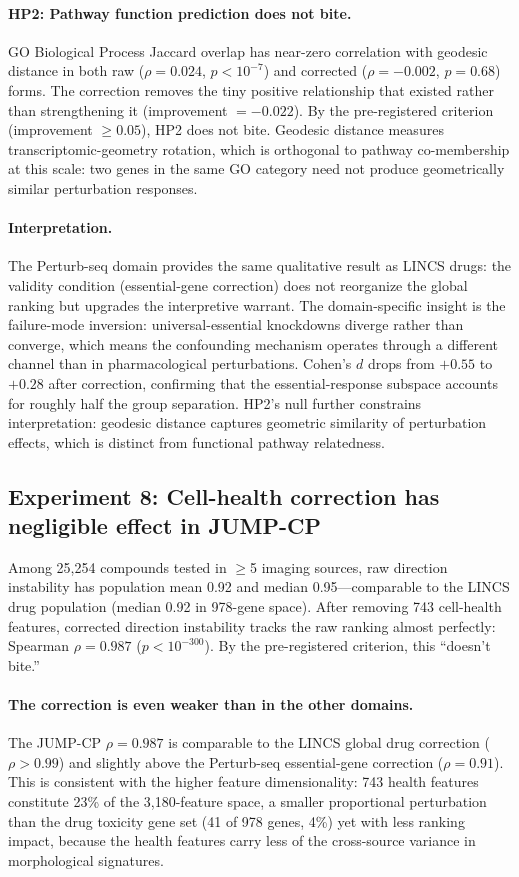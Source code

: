 \documentclass{article}
\begin{document}
\paragraph{HP2: Pathway function prediction does not bite.}
GO Biological Process Jaccard overlap has near-zero correlation with geodesic
distance in both raw ($\rho = 0.024$, $p < 10^{-7}$) and corrected ($\rho =
-0.002$, $p = 0.68$) forms. The correction removes the tiny positive
relationship that existed rather than strengthening it (improvement $=
-0.022$). By the pre-registered criterion (improvement $\geq 0.05$), HP2
does not bite. Geodesic distance measures transcriptomic-geometry rotation,
which is orthogonal to pathway co-membership at this scale: two genes in the
same GO category need not produce geometrically similar perturbation
responses.

\paragraph{Interpretation.}
The Perturb-seq domain provides the same qualitative result as LINCS drugs:
the validity condition (essential-gene correction) does not reorganize the
global ranking but upgrades the interpretive warrant. The domain-specific
insight is the failure-mode inversion: universal-essential knockdowns
diverge rather than converge, which means the confounding mechanism operates
through a different channel than in pharmacological perturbations. Cohen's $d$
drops from $+0.55$ to $+0.28$ after correction, confirming that the
essential-response subspace accounts for roughly half the group separation.
HP2's null further constrains interpretation: geodesic distance captures
geometric similarity of perturbation effects, which is distinct from
functional pathway relatedness.

\subsection{Experiment 8: Cell-health correction has negligible effect in JUMP-CP}

Among 25{,}254 compounds tested in $\geq$5 imaging sources, raw direction
instability has population mean 0.92 and median 0.95---comparable to the
LINCS drug population (median 0.92 in 978-gene space). After removing 743
cell-health features, corrected direction instability tracks the raw ranking
almost perfectly: Spearman $\rho = 0.987$ ($p < 10^{-300}$). By the
pre-registered criterion, this ``doesn't bite.''

\paragraph{The correction is even weaker than in the other domains.}
The JUMP-CP $\rho = 0.987$ is comparable to the LINCS global drug
correction ($\rho > 0.99$) and slightly above the Perturb-seq
essential-gene correction ($\rho = 0.91$). This
is consistent with the higher feature dimensionality: 743 health features
constitute 23\% of the 3{,}180-feature space, a smaller proportional
perturbation than the drug toxicity gene set (41 of 978 genes, 4\%) yet
with less ranking impact, because the health features carry less of the
cross-source variance in morphological signatures.
\end{document}
